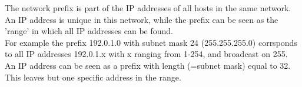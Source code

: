 The network prefix is part of the IP addresses of all hosts in the same network.\\
An IP address is unique in this network, while the prefix can be seen as the 'range' in which all IP addresses can be found. \\
For example the prefix 192.0.1.0 with subnet mask 24 (255.255.255.0) corrsponds to all IP addresses 192.0.1.x with x ranging from 1-254, and broadcast on 255.\\

An IP address can be seen as a prefix with length (=subnet mask) equal to 32. This leaves but one specific address in the range.